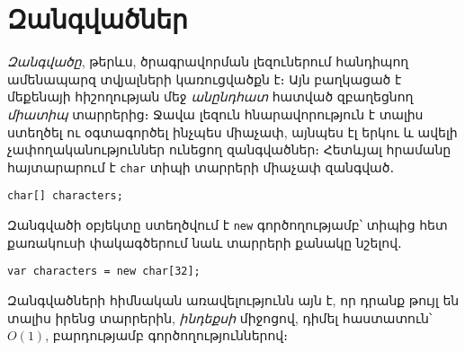\chapter{Զանգվածներ}

\emph{Զանգվածը}, թերևս, ծրագրավորման լեզուներում հանդիպող ամենապարզ
տվյալների կառուցվածքն է։ Այն բաղկացած է մեքենայի հիշողության մեջ
\emph{անընդհատ} հատված զբաղեցնող \emph{միատիպ} տարրերից։ Ջավա լեզուն
հնարավորություն է տալիս ստեղծել ու օգտագործել ինչպես միաչափ, այնպես
էլ երկու և ավելի չափողականություններ ունեցող զանգվածներ։ Հետևյալ
հրամանը հայտարարում է \texttt{char} տիպի տարրերի միաչափ զանգված․

\begin{verbatim}
char[] characters;
\end{verbatim}

Զանգվածի օբյեկտը ստեղծվում է \texttt{new} գործողությամբ՝ տիպից հետ
քառակուսի փակագծերում նաև տարրերի քանակը նշելով․

\begin{verbatim}
var characters = new char[32];
\end{verbatim}


Զանգվածների հիմնական առավելությունն այն է, որ դրանք թույլ են տալիս
իրենց տարրերին, \emph{ինդեքսի} միջոցով, դիմել հաստատուն՝ \(O(1)\),
բարդությամբ գործողություններով։


